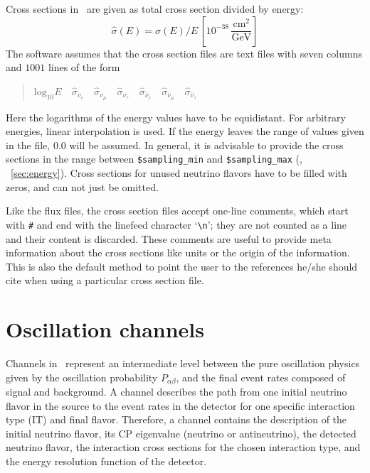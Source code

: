 Cross sections in \GLOBES\ are given as total cross section divided by energy:
\begin{equation}
\hat\sigma(E)=\sigma(E)/E\,\left[ 10^{-38}\,
\frac{\mathrm{cm}^2}{\mathrm{GeV}} \right]
\end{equation}
The software assumes that the cross section files are text files with 
seven columns and $1001$ lines of the form
\begin{quotation}
$\mathrm{log}_{10} E\quad
\hat\sigma_{\nu_e}\quad
\hat\sigma_{\nu_\mu}\quad
\hat\sigma_{\nu_\tau}\quad
\hat\sigma_{\bar\nu_e}\quad
\hat\sigma_{\bar\nu_\mu}\quad
\hat\sigma_{\bar\nu_\tau}$
\end{quotation}
Here the logarithms of the energy values have to be equidistant. For 
arbitrary energies, linear interpolation is used. If the energy leaves the
range of values given in the file, $0.0$ will be assumed. In general, it is advisable to provide the cross sections in the range between {\tt \$sampling\_min} and {\tt \$sampling\_max} (\cf, \Sec~\ref{sec:energy}).
Cross sections for unused neutrino flavors have to be filled with zeros, and
can not just be omitted.

Like the flux files, the cross section files 
accept one-line comments, which start
with {\tt \#} and end with the linefeed character `\verb+\n+'; they are
not counted as a line and their content is discarded. These comments
are useful to provide meta information about the cross sections like units
or the origin of the information. This is also the default method
to point the user to the references he/she should cite when using
a particular cross section file.

\section{Oscillation channels}
\label{sec:channel}

Channels in \GLOBES\ represent an intermediate level 
between the pure oscillation physics given by the oscillation probability
$P_{\alpha\beta}$, and the final event rates composed of signal and 
background. A channel describes the path from one
initial neutrino flavor in the source to the event rates in the detector for one specific interaction type (IT) and final flavor.  
Therefore, a channel contains the description of the 
initial neutrino flavor, its CP eigenvalue 
(neutrino or antineutrino), 
the detected neutrino flavor, the interaction cross sections for the chosen interaction type, and the energy resolution function of the detector.

